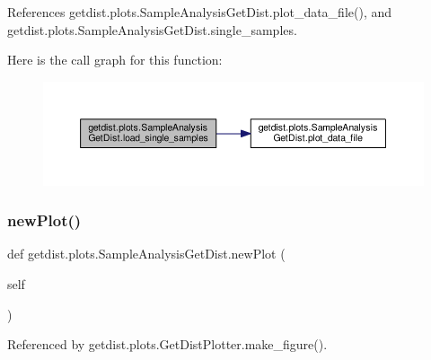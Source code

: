 References getdist.\+plots.\+Sample\+Analysis\+Get\+Dist.\+plot\+\_\+data\+\_\+file(), and getdist.\+plots.\+Sample\+Analysis\+Get\+Dist.\+single\+\_\+samples.

Here is the call graph for this function\+:
\nopagebreak
\begin{figure}[H]
\begin{center}
\leavevmode
\includegraphics[width=350pt]{classgetdist_1_1plots_1_1SampleAnalysisGetDist_a4ff28c8ef05818d493ca2242a320cb43_cgraph}
\end{center}
\end{figure}
\mbox{\label{classgetdist_1_1plots_1_1SampleAnalysisGetDist_a216dc4169528317eabebecce1fa974a4}} 
\subsubsection{\texorpdfstring{new\+Plot()}{newPlot()}}
{\footnotesize\ttfamily def getdist.\+plots.\+Sample\+Analysis\+Get\+Dist.\+new\+Plot (\begin{DoxyParamCaption}\item[{}]{self }\end{DoxyParamCaption})}



Referenced by getdist.\+plots.\+Get\+Dist\+Plotter.\+make\+\_\+figure().

